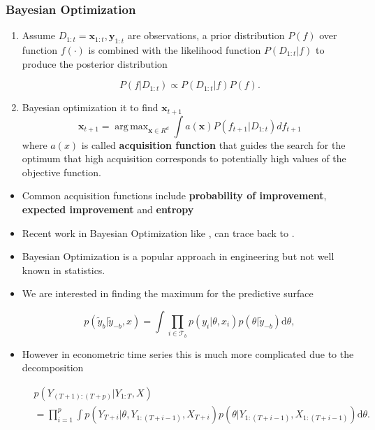 \documentclass[11pt]{beamer}
\DeclareMathOperator*{\argmax}{arg\,max}
\begin{document}
\begin{frame}[allowframebreaks]
  \frametitle{Bayesian Optimization}

  \begin{enumerate}
  \item Assume $D_{1:t} = {\bm{x}_{1:t} , \bm{y}_{1:t} }$ are
    observations, a prior distribution $P (f )$ over function $f(\cdot)$ is
    combined with the likelihood function $P (D_{1:t} |f )$ to produce
    the posterior distribution

    \begin{equation*}
      P (f|D_{1:t} ) \propto P (D_{1:t} |f )P (f ).
    \end{equation*}

  \item Bayesian optimization it to find $\bm{x}_{t+1}$
    \begin{equation}
      \label{eq:bayes-optim}
      \bm{x}_{t+1} = \argmax_{\bm{x} \in R^d} \int a(\bm{x})  P (f_{t+1}|D_{1:t}
      )d f_{t+1}
    \end{equation}
    where $a(x)$ is called \textbf{acquisition function}
    that guides the search for the optimum that high acquisition
    corresponds to potentially high values of the objective function.

  \end{enumerate}
  \begin{itemize}
  \item Common acquisition functions include \textbf{probability of
      improvement}, \textbf{expected improvement} and \textbf{entropy}
    \citep{kushner1964new, mockus1978application,jones2001taxonomy,
      cox1997sdo,brochu2010hedging, villemonteix2009informational}

  \item Recent work in Bayesian Optimization like
    \citet{jones1998efficient} \citet{jones2001taxonomy},
    \citet{bergstra2012random} can trace back to
    \citet{cox1997sdo}.

  \item Bayesian Optimization is a popular approach in engineering but
    not well known in statistics.

    \newpage
  \item We are interested in finding the maximum for the predictive surface

    \[p(\tilde{y}_{b}|\tilde{y}_{-b},x)=\int\prod_{i\in\mathcal{T}_{b}}p(y_{i}|\theta,x_{i})p(\theta|\tilde{y}_{-b})\mathrm{d}\theta,\]

  \item However in econometric time series this is much more
    complicated due to the decomposition

    \begin{align*}
      &p(Y_{(T+1):(T+p)}|Y_{1:T},X)\\
      &=\prod\limits _{i=1}^{p}\int
      p(Y_{T+i}|\theta,Y_{1:(T+i-1)}, X_{T+i})p(\theta|Y_{1:(T+i-1)},X_{{1:(T+i-1)}})\mathrm{d}\theta.
    \end{align*}

  \end{itemize}
\end{frame}
\end{document}
